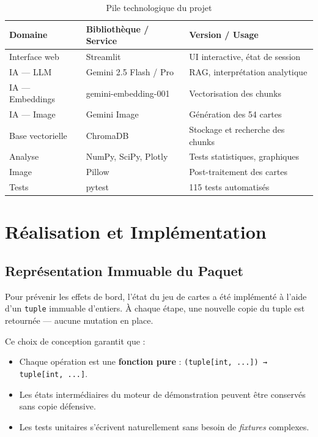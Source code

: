 \documentclass[12pt,a4paper]{article}
\begin{document}
\begin{table}[H]
\centering
\caption{Pile technologique du projet}
\begin{tabular}{lll}
\toprule
\textbf{Domaine} & \textbf{Bibliothèque / Service} & \textbf{Version / Usage} \\
\midrule
Interface web & Streamlit & UI interactive, état de session \\
IA — LLM & Gemini 2.5 Flash / Pro & RAG, interprétation analytique \\
IA — Embeddings & gemini-embedding-001 & Vectorisation des chunks \\
IA — Image & Gemini Image & Génération des 54 cartes \\
Base vectorielle & ChromaDB & Stockage et recherche des chunks \\
Analyse & NumPy, SciPy, Plotly & Tests statistiques, graphiques \\
Image & Pillow & Post-traitement des cartes \\
Tests & pytest & 115 tests automatisés \\
\bottomrule
\end{tabular}
\label{tab:techstack}
\end{table}

\section{Réalisation et Implémentation}

\subsection{Représentation Immuable du Paquet}
Pour prévenir les effets de bord, l'état du jeu de cartes a été implémenté à l'aide d'un \texttt{tuple} immuable d'entiers. À chaque étape, une nouvelle copie du tuple est retournée — aucune mutation en place.

Ce choix de conception garantit que :
\begin{itemize}
    \item Chaque opération est une \textbf{fonction pure} : \texttt{(tuple[int, ...]) → tuple[int, ...]}.
    \item Les états intermédiaires du moteur de démonstration peuvent être conservés sans copie défensive.
    \item Les tests unitaires s'écrivent naturellement sans besoin de \textit{fixtures} complexes.
\end{itemize}
\end{document}
